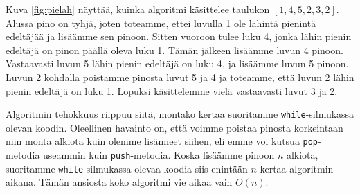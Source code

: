 Kuva \ref{fig:pielah} näyttää, kuinka algoritmi käsittelee taulukon $[1,4,5,2,3,2]$.
Alussa pino on tyhjä, joten toteamme, ettei luvulla 1
ole lähintä pienintä edeltäjää ja lisäämme sen pinoon.
Sitten vuoroon tulee luku 4, jonka lähin pienin edeltäjä
on pinon päällä oleva luku 1. Tämän jälkeen lisäämme luvun 4 pinoon.
Vastaavasti luvun 5 lähin pienin edeltäjä on luku 4,
ja lisäämme luvun 5 pinoon.
Luvun 2 kohdalla poistamme pinosta luvut 5 ja 4
ja toteamme, että luvun 2 lähin pienin edeltäjä on luku 1.
Lopuksi käsittelemme vielä vastaavasti luvut 3 ja 2.

Algoritmin tehokkuus riippuu siitä, montako kertaa suoritamme
\texttt{while}-silmukassa olevan koodin.
Oleellinen havainto on, että voimme poistaa pinosta
korkeintaan niin monta alkiota kuin olemme lisänneet siihen,
eli emme voi kutsua \texttt{pop}-metodia useammin kuin \texttt{push}-metodia.
Koska lisäämme pinoon $n$ alkiota, suoritamme \texttt{while}-silmukassa
olevaa koodia siis enintään $n$ kertaa algoritmin aikana.
Tämän ansiosta koko algoritmi vie aikaa vain $O(n)$.